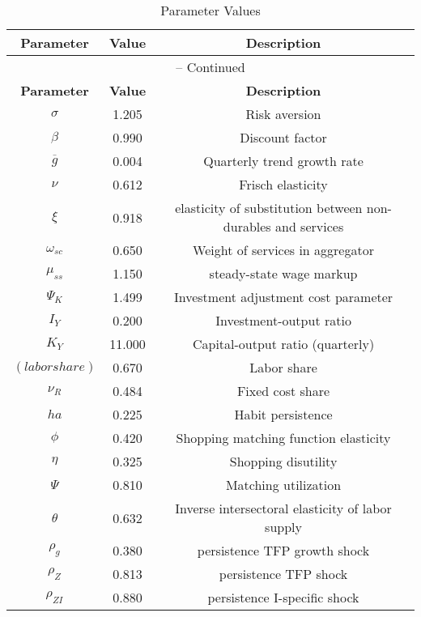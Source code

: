 \begin{center}
\begin{longtable}{ccc}
\caption{Parameter Values}\\%
\toprule%
\multicolumn{1}{c}{\textbf{Parameter}} &
\multicolumn{1}{c}{\textbf{Value}} &
 \multicolumn{1}{c}{\textbf{Description}}\\%
\midrule%
\endfirsthead
\multicolumn{3}{c}{{\tablename} \thetable{} -- Continued}\\%
\midrule%
\multicolumn{1}{c}{\textbf{Parameter}} &
\multicolumn{1}{c}{\textbf{Value}} &
  \multicolumn{1}{c}{\textbf{Description}}\\%
\midrule%
\endhead
${\sigma}$ 	 & 	 1.205 	 & 	 Risk aversion\\
${\beta}$ 	 & 	 0.990 	 & 	 Discount factor\\
${\overline{g}}$ 	 & 	 0.004 	 & 	 Quarterly trend growth rate\\
$\nu$ 	 & 	 0.612 	 & 	 Frisch elasticity\\
$\xi$ 	 & 	 0.918 	 & 	 elasticity of substitution between non-durables and services\\
$\omega_{sc}$ 	 & 	 0.650 	 & 	 Weight of services in aggregator\\
$\mu_{ss}$ 	 & 	 1.150 	 & 	 steady-state wage markup\\
${\Psi_{K}}$ 	 & 	 1.499 	 & 	 Investment adjustment cost parameter\\
${I_Y}$ 	 & 	 0.200 	 & 	 Investment-output ratio\\
${K_Y}$ 	 & 	 11.000 	 & 	 Capital-output ratio (quarterly)\\
$(labor share)$ 	 & 	 0.670 	 & 	 Labor share\\
${\nu_R}$ 	 & 	 0.484 	 & 	 Fixed cost share\\
${ha}$ 	 & 	 0.225 	 & 	 Habit persistence\\
${\phi}$ 	 & 	 0.420 	 & 	 Shopping matching function elasticity\\
${\eta}$ 	 & 	 0.325 	 & 	 Shopping disutility\\
${\Psi}$ 	 & 	 0.810 	 & 	 Matching utilization\\
${\theta}$ 	 & 	 0.632 	 & 	 Inverse intersectoral elasticity of labor supply\\
${\rho_g}$ 	 & 	 0.380 	 & 	 persistence TFP growth shock\\
${\rho_Z}$ 	 & 	 0.813 	 & 	 persistence TFP shock\\
${\rho_{ZI}}$ 	 & 	 0.880 	 & 	 persistence I-specific shock\\

\end{longtable}
\end{center}
